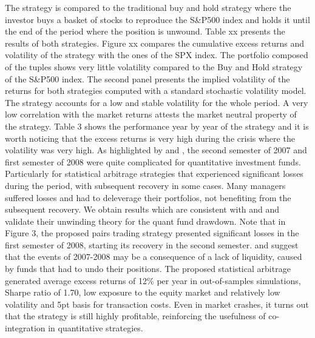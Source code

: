 \documentclass[11pt,a4,twosided,singlespacing,titlepagenumber=on]{scrreprt}
\numberwithin{equation}{chapter} %
\theoremstyle{remark}
\begin{document}
The strategy is compared to the traditional buy and hold strategy where the investor buys a basket of stocks to reproduce the S\&P500 index and holds it until the end of the period where the position is unwound. Table xx presents the results of both strategies. Figure xx compares the cumulative excess returns and volatility of the strategy with the ones of the SPX index. The portfolio composed of the tuples shows very little volatility compared to the Buy and Hold strategy of the S\&P500 index. The second panel presents the implied volatility of the returns for both strategies computed with a standard stochastic volatility model. The strategy accounts for a low and stable volatility for the whole period. A very low correlation with the market returns attests the market neutral property of the strategy. Table 3 shows the performance year by year of the strategy and it is worth noticing that the excess returns is very high during the crisis where the volatility was very high. As highlighted by \cite{khandani2007} and \cite{avellaneda2010}, the second semester of 2007 and first semester of 2008 were quite complicated for quantitative investment funds. Particularly for statistical arbitrage strategies that experienced significant losses during the period, with subsequent recovery in some cases. Many managers suffered losses and had to deleverage their portfolios, not benefiting from the subsequent recovery. We obtain results which are consistent with \cite{khandani2007} and \cite{avellaneda2010} and validate their unwinding theory for the quant fund drawdown. Note that in Figure 3, the proposed pairs trading strategy presented significant losses in the first semester of 2008, starting its recovery in the second semester. \cite{khandani2007} and \cite{avellaneda2010} suggest that the events of 2007-2008 may be a consequence of a lack of liquidity, caused by funds that had to undo their positions. The proposed statistical arbitrage generated average excess returns of 12\% per year in out-of-samples simulations, Sharpe ratio of 1.70, low exposure to the equity market and relatively low volatility and 5pt basis for transaction costs. Even in market crashes, it turns out that the strategy is still highly profitable, reinforcing the usefulness of co-integration in quantitative strategies.
\end{document}
